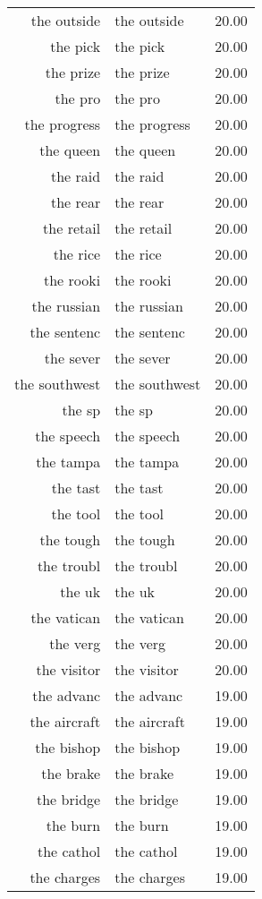 \begin{table}[ht]
\begin{tabular}{rlr}
  the outside & the outside & 20.00 \\ 
  the pick & the pick & 20.00 \\ 
  the prize & the prize & 20.00 \\ 
  the pro & the pro & 20.00 \\ 
  the progress & the progress & 20.00 \\ 
  the queen & the queen & 20.00 \\ 
  the raid & the raid & 20.00 \\ 
  the rear & the rear & 20.00 \\ 
  the retail & the retail & 20.00 \\ 
  the rice & the rice & 20.00 \\ 
  the rooki & the rooki & 20.00 \\ 
  the russian & the russian & 20.00 \\ 
  the sentenc & the sentenc & 20.00 \\ 
  the sever & the sever & 20.00 \\ 
  the southwest & the southwest & 20.00 \\ 
  the sp & the sp & 20.00 \\ 
  the speech & the speech & 20.00 \\ 
  the tampa & the tampa & 20.00 \\ 
  the tast & the tast & 20.00 \\ 
  the tool & the tool & 20.00 \\ 
  the tough & the tough & 20.00 \\ 
  the troubl & the troubl & 20.00 \\ 
  the uk & the uk & 20.00 \\ 
  the vatican & the vatican & 20.00 \\ 
  the verg & the verg & 20.00 \\ 
  the visitor & the visitor & 20.00 \\ 
  the advanc & the advanc & 19.00 \\ 
  the aircraft & the aircraft & 19.00 \\ 
  the bishop & the bishop & 19.00 \\ 
  the brake & the brake & 19.00 \\ 
  the bridge & the bridge & 19.00 \\ 
  the burn & the burn & 19.00 \\ 
  the cathol & the cathol & 19.00 \\ 
  the charges & the charges & 19.00 \\ 

\end{tabular}
\end{table}
